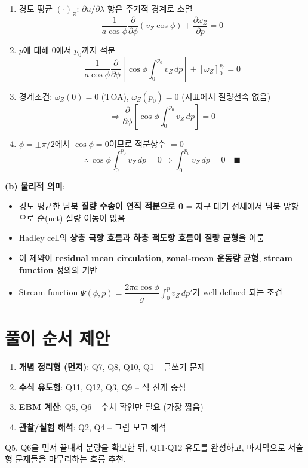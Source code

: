 \documentclass[11pt,a4paper]{article}
\begin{document}
\begin{enumerate}
    \item 경도 평균 $(\cdot)_Z$: $\partial u/\partial \lambda$ 항은 주기적 경계로 소멸
    $$\frac{1}{a\cos\phi}\frac{\partial}{\partial \phi}(v_Z\cos\phi) + \frac{\partial \omega_Z}{\partial p} = 0$$
    \item $p$에 대해 $0$에서 $p_0$까지 적분
    $$\frac{1}{a\cos\phi}\frac{\partial}{\partial \phi}\left[\cos\phi\int_0^{p_0} v_Z\,dp\right] + [\omega_Z]_0^{p_0} = 0$$
    \item 경계조건: $\omega_Z(0)=0$ (TOA), $\omega_Z(p_0)=0$ (지표에서 질량선속 없음)
    $$\Rightarrow \frac{\partial}{\partial \phi}\left[\cos\phi\int_0^{p_0} v_Z\,dp\right] = 0$$
    \item $\phi = \pm \pi/2$에서 $\cos\phi = 0$이므로 적분상수 $= 0$
    $$\therefore\ \cos\phi\int_0^{p_0} v_Z\,dp = 0 \Rightarrow \int_0^{p_0} v_Z\,dp = 0 \quad \blacksquare$$
\end{enumerate}

\textbf{(b) 물리적 의미}:
\begin{itemize}
    \item 경도 평균한 남북 \textbf{질량 수송이 연직 적분으로 0} = 지구 대기 전체에서 남북 방향으로 순(net) 질량 이동이 없음
    \item Hadley cell의 \textbf{상층 극향 흐름과 하층 적도향 흐름이 질량 균형}을 이룸
    \item 이 제약이 \textbf{residual mean circulation}, \textbf{zonal-mean 운동량 균형}, \textbf{stream function} 정의의 기반
    \item Stream function $\Psi(\phi,p) = \dfrac{2\pi a \cos\phi}{g}\int_0^p v_Z\,dp'$가 well-defined 되는 조건
\end{itemize}

\section*{풀이 순서 제안}
\begin{enumerate}
    \item \textbf{개념 정리형 (먼저)}: Q7, Q8, Q10, Q1 -- 글쓰기 문제
    \item \textbf{수식 유도형}: Q11, Q12, Q3, Q9 -- 식 전개 중심
    \item \textbf{EBM 계산}: Q5, Q6 -- 수치 확인만 필요 (가장 짧음)
    \item \textbf{관찰/실험 해석}: Q2, Q4 -- 그림 보고 해석
\end{enumerate}

Q5, Q6을 먼저 끝내서 분량을 확보한 뒤, Q11$\cdot$Q12 유도를 완성하고, 마지막으로 서술형 문제들을 마무리하는 흐름 추천.
\end{document}
